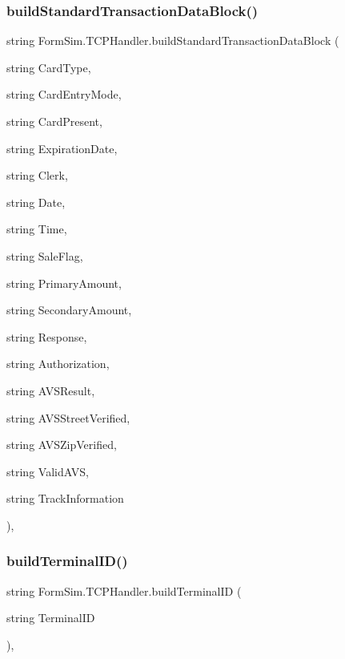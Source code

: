 \subsubsection{\texorpdfstring{build\+Standard\+Transaction\+Data\+Block()}{buildStandardTransactionDataBlock()}}
{\footnotesize\ttfamily string Form\+Sim.\+T\+C\+P\+Handler.\+build\+Standard\+Transaction\+Data\+Block (\begin{DoxyParamCaption}\item[{string}]{Card\+Type,  }\item[{string}]{Card\+Entry\+Mode,  }\item[{string}]{Card\+Present,  }\item[{string}]{Expiration\+Date,  }\item[{string}]{Clerk,  }\item[{string}]{Date,  }\item[{string}]{Time,  }\item[{string}]{Sale\+Flag,  }\item[{string}]{Primary\+Amount,  }\item[{string}]{Secondary\+Amount,  }\item[{string}]{Response,  }\item[{string}]{Authorization,  }\item[{string}]{A\+V\+S\+Result,  }\item[{string}]{A\+V\+S\+Street\+Verified,  }\item[{string}]{A\+V\+S\+Zip\+Verified,  }\item[{string}]{Valid\+A\+VS,  }\item[{string}]{Track\+Information }\end{DoxyParamCaption})\hspace{0.3cm}{\ttfamily [inline]}, {\ttfamily [private]}}

\mbox{\label{class_form_sim_1_1_t_c_p_handler_a19f3ec26051c3752e6fcd6813f7b3367}} 
\subsubsection{\texorpdfstring{build\+Terminal\+I\+D()}{buildTerminalID()}}
{\footnotesize\ttfamily string Form\+Sim.\+T\+C\+P\+Handler.\+build\+Terminal\+ID (\begin{DoxyParamCaption}\item[{string}]{Terminal\+ID }\end{DoxyParamCaption})\hspace{0.3cm}{\ttfamily [inline]}, {\ttfamily [private]}}


